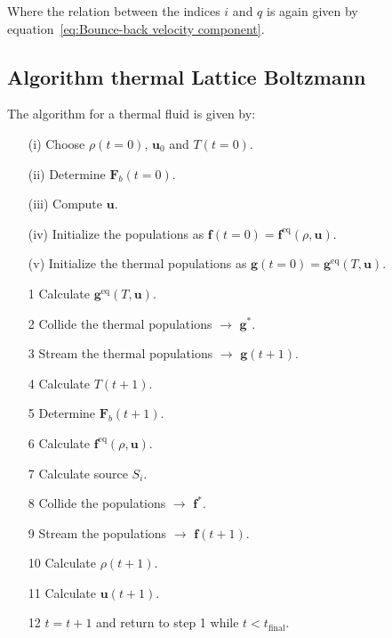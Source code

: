 Where the relation between the indices $i$ and $q$ is again given by equation~\ref{eq:Bounce-back velocity component}. 

\subsection{Algorithm thermal Lattice Boltzmann}
The algorithm for a thermal fluid is given by:

\begin{itemize}\label{it:Algorithm thermal Lattice Boltzmann}
    \item[(i)] Choose $\rho(t=0)$, $\bm{u}_0$ and $T(t=0)$.
    \item[(ii)] Determine $\bm{F}_b(t=0)$.
    \item[(iii)] Compute $\bm{u}$. 
    \item[(iv)] Initialize the populations as $\bm{f}(t=0) = \bm{f}^{\text{eq}}(\rho, \bm{u})$. 
    \item[(v)] Initialize the thermal populations as $\bm{g}(t=0) = \bm{g}^{\text{eq}}(T, \bm{u})$. 
    \item[1] Calculate $\bm{g}^{\text{eq}}(T, \bm{u})$.
    \item[2] Collide the thermal populations $\rightarrow$ $\bm{g}^{\ast}$.
    \item[3] Stream the thermal populations $\rightarrow$ $\bm{g}(t + 1)$.
    \item[4] Calculate $T(t+1)$.
    \item[5] Determine $\bm{F}_b(t+1)$.
    \item[6] Calculate $\bm{f}^{\text{eq}}(\rho, \bm{u})$.
    \item[7] Calculate source $S_i$.
    \item[8] Collide the populations $\rightarrow$ $\bm{f}^{\ast}$.
    \item[9] Stream the populations $\rightarrow$ $\bm{f}(t + 1)$.
    \item[10] Calculate $\rho(t + 1)$.
    \item[11] Calculate $\bm{u}(t + 1)$.
    \item[12] $t = t + 1$ and return to step 1 while $t < t_{\text{final}}$.
\end{itemize}

